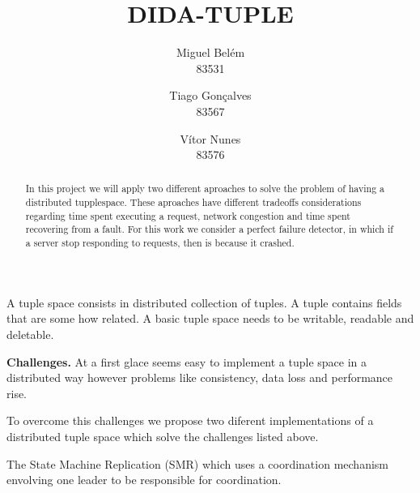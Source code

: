 \documentclass[times, 10pt,twocolumn]{article}
\begin{document}
\title{DIDA-TUPLE}

\author{Miguel Belém\\
83531\\
\and
Tiago Gonçalves\\
83567\\
\and
Vítor Nunes\\
83576\\
}

\maketitle
\thispagestyle{empty}

\begin{abstract}
   In this project we will apply two different aproaches to solve the problem of
   having a distributed tupplespace. 
   These aproaches have different tradeoffs considerations regarding time spent 
   executing a request, network congestion and time spent recovering from a fault.
   For this work we consider a perfect failure detector, in which if a server stop
   responding to requests, then is because it crashed.   
\end{abstract}




A tuple space consists in distributed collection of tuples. A tuple contains
fields that are some how related.
A basic tuple space needs to be writable, readable and deletable.

\textbf{Challenges.} At a first glace seems easy to implement a tuple space
in a distributed way however problems like consistency, data loss and 
performance rise.

To overcome this challenges we propose two diferent implementations of a 
distributed tuple space which solve the challenges listed above.

The State Machine Replication (SMR) which uses a coordination mechanism envolving
one leader to be responsible for coordination.
\end{document}
